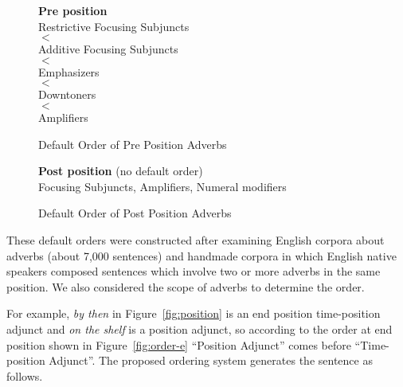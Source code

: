 \begin{singlespace}    
\begin{figure}[htbp]
    \small
    {\bf Pre position} \\
    \hspace*{2cm} Restrictive Focusing Subjuncts \\
    \hspace*{2cm} $<$ \\
    \hspace*{2cm} Additive Focusing Subjuncts \\
    \hspace*{2cm} $<$ \\
    \hspace*{2cm} Emphasizers \\
    \hspace*{2cm} $<$ \\
    \hspace*{2cm} Downtoners \\
    \hspace*{2cm} $<$ \\
    \hspace*{2cm} Amplifiers \\
    \vspace*{-2mm}
    \caption{Default Order of Pre Position Adverbs}
    \label{fig:order-pre}
\end{figure}
\end{singlespace}

\begin{figure}[htbp]
    \leavevmode
    \small    
    {\bf Post position} (no default order)\\
    \hspace*{2cm} Focusing Subjuncts, Amplifiers, Numeral modifiers 
    \caption{Default Order of Post Position Adverbs}
    \label{fig:order-post}
\end{figure}

These default orders were constructed after examining English corpora
about adverbs (about 7,000 sentences) and handmade corpora in which
English native speakers composed sentences which involve two or more
adverbs in the same position.  We also considered the scope of adverbs
to determine the order.

For example, {\em by then} in Figure~\ref{fig:position} is an end position 
time-position adjunct and {\em on the shelf} is a position adjunct, so 
according to the order at end position shown in 
Figure~\ref{fig:order-e} ``Position Adjunct'' comes before 
``Time-position Adjunct''. 
The proposed ordering system generates the sentence as follows.

